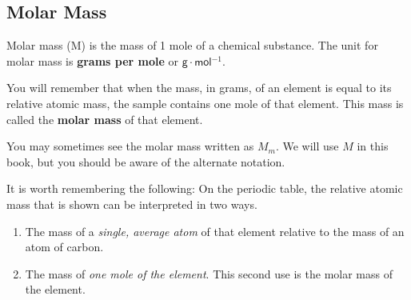             \subsection*{Molar Mass}
            \nopagebreak
\par
            \label{m38717*fhsst!!!underscore!!!id147}
 { \label{m38717*meaningfhsst!!!underscore!!!id147}
      \label{m38717*id276397}Molar mass (M) is the mass of 1 mole of a chemical substance. The unit for molar mass is \textbf{grams per mole} or $\mathsf{g}\ensuremath{\cdot}\mathsf{mol}{}^{-1}$. \par 
       } 
      \label{m38717*id276429}You will remember that when the mass, in grams, of an element is equal to its relative atomic mass, the sample contains one mole of that element. This mass is called the \textbf{molar mass} of that element.\par 
      \label{m38717*eip-277}You may sometimes see the molar mass written as ${M}_{m}$. We will use $M$ in this book, but you should be aware of the alternate notation.\par \label{m38717*id276445}It is worth remembering the following: On the periodic table, the relative atomic mass that is shown can be interpreted in two ways.\par 
      \label{m38717*id276451}\begin{enumerate}[noitemsep, label=\textbf{\arabic*}. ] 
            \label{m38717*uid9}\item The mass of a \textsl{single, average atom} of that element relative to the mass of an atom of carbon.
\label{m38717*uid10}\item The mass of \textsl{one mole of the element}. This second use is the molar mass of the element.
\end{enumerate}
